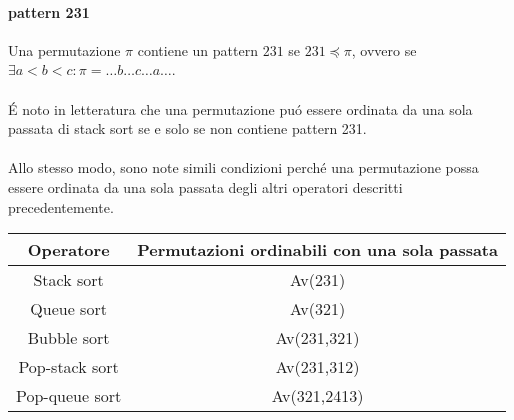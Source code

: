 \paragraph*{pattern 231}Una permutazione $\pi$ contiene un pattern $231$ se $231\preceq\pi$, ovvero se $\exists a<b<c: \pi =\dots{b}\dots{c}\dots{a}\dots$.\\\\
\'E noto in letteratura \cite{limbrief} che una permutazione pu\'o essere ordinata da una sola passata di stack sort se e solo se non contiene pattern 231.\\\\
Allo stesso modo, sono note simili condizioni perch\'e una permutazione possa essere ordinata da una sola passata degli altri operatori descritti precedentemente.\\
\begin{center}
\begin{tabular}{ |c|c| } 
\hline
\textbf{Operatore} & \textbf{Permutazioni ordinabili con una sola passata} \\ 
\hline
Stack sort & Av(231)\\ 
Queue sort & Av(321)\\ 
Bubble sort & Av(231,321)\\ 
Pop-stack sort & Av(231,312)\\ 
Pop-queue sort& Av(321,2413)\\ 
\hline
\end{tabular}
\end{center}
